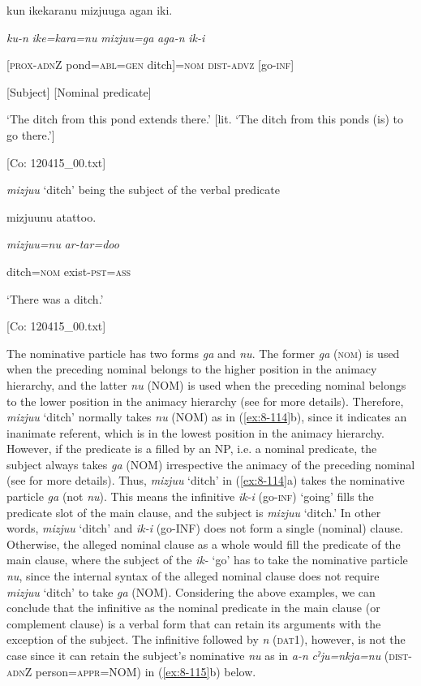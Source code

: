   {\TM}
\glll  kun  {\textbar}ike{\textbar}karanu  mizjuuga  agan  iki.

    \textit{ku-n}  \textit{ike=kara=nu}  \textit{mizjuu=ga}  \textit{aga-n}  \textit{ik-i}

    [\textsc{prox}-\textsc{adn}Z  pond=\textsc{abl}=\textsc{gen}  ditch]=\textsc{nom}  \textsc{dist}-\textsc{advz}  [go-\textsc{inf}]

    [Subject]    [Nominal predicate]

    ‘The ditch from this pond extends there.’ [lit. ‘The ditch from this ponds (is) to go there.’]

    [Co: 120415\_00.txt]
\z

\ex \textit{mizjuu} ‘ditch’ being the subject of the verbal predicate

  {\TM}
\glll  mizjuunu  atattoo.

    \textit{mizjuu=nu}  \textit{ar-tar=doo}      

    ditch=\textsc{nom}  exist-\textsc{pst}=\textsc{ass}

    ‘There was a ditch.’

    [Co: 120415\_00.txt]
\z

The nominative particle has two forms \textit{ga} and \textit{nu}. The former \textit{ga} (\textsc{nom}) is used when the preceding nominal belongs to the higher position in the animacy hierarchy, and the latter \textit{nu} (NOM) is used when the preceding nominal belongs to the lower position in the animacy hierarchy (see  for more details). Therefore, \textit{mizjuu} ‘ditch’ normally takes \textit{nu} (NOM) as in (\ref{ex:8-114}b), since it indicates an inanimate referent, which is in the lowest position in the animacy hierarchy. However, if the predicate is a filled by an NP, i.e. a nominal predicate, the subject always takes \textit{ga} (NOM) irrespective the animacy of the preceding nominal (see  for more details). Thus, \textit{mizjuu} ‘ditch’ in (\ref{ex:8-114}a) takes the nominative particle \textit{ga} (not \textit{nu}). This means the infinitive \textit{ik-i} (go-\textsc{inf}) ‘going’ fills the predicate slot of the main clause, and the subject is \textit{mizjuu} ‘ditch.’ In other words, \textit{mizjuu} ‘ditch’ and \textit{ik-i} (go-INF) does not form a single (nominal) clause. Otherwise, the alleged nominal clause as a whole would fill the predicate of the main clause, where the subject of the \textit{ik-} ‘go’ has to take the nominative particle \textit{nu}, since the internal syntax of the alleged nominal clause does not require \textit{mizjuu} ‘ditch’ to take \textit{ga} (NOM). Considering the above examples, we can conclude that the infinitive as the nominal predicate in the main clause (or complement clause) is a verbal form that can retain its arguments with the exception of the subject. The infinitive followed by \textit{n} (\textsc{dat}1), however, is not the case since it can retain the subject’s nominative \textit{nu} as in \textit{a-n} \textit{cˀju=nkja=nu} (\textsc{dist}-\textsc{adn}Z person=\textsc{appr}=NOM) in (\ref{ex:8-115}b) below.

